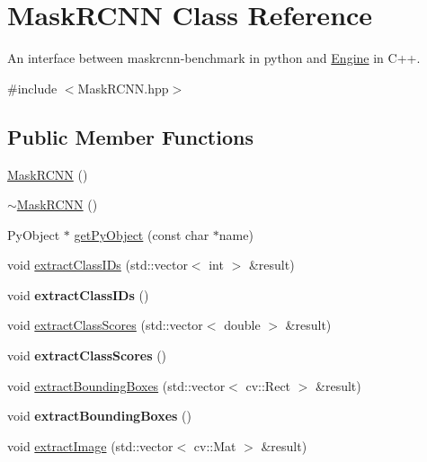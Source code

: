 \hypertarget{classMaskRCNN}{}\section{Mask\+R\+C\+NN Class Reference}
\label{classMaskRCNN}


An interface between maskrcnn-\/benchmark in python and \hyperlink{classEngine}{Engine} in C++.  




{\ttfamily \#include $<$Mask\+R\+C\+N\+N.\+hpp$>$}

\subsection*{Public Member Functions}
\begin{DoxyCompactItemize}
\item 
\hyperlink{classMaskRCNN_ad50b7f9668dbe3fbd9f63a509ffaa589}{Mask\+R\+C\+NN} ()
\item 
\hyperlink{classMaskRCNN_a56a6b1e8170b6cb5aceb0fcd1b529eeb}{$\sim$\+Mask\+R\+C\+NN} ()
\item 
Py\+Object $\ast$ \hyperlink{classMaskRCNN_ac053158f922a85807ba5bba9822848c7}{get\+Py\+Object} (const char $\ast$name)
\item 
void \hyperlink{classMaskRCNN_ad5c6a4317fbd032d5570ef672921d2b7}{extract\+Class\+I\+Ds} (std\+::vector$<$ int $>$ \&result)
\item 
\mbox{\label{classMaskRCNN_a7f8f5e498aaac37e57d46a029e7a3013}} 
void {\bfseries extract\+Class\+I\+Ds} ()
\item 
void \hyperlink{classMaskRCNN_af7c4acde0601ceb535d1ab7d79cf5825}{extract\+Class\+Scores} (std\+::vector$<$ double $>$ \&result)
\item 
\mbox{\label{classMaskRCNN_a91352e91d286e8829daed64eaef84aa8}} 
void {\bfseries extract\+Class\+Scores} ()
\item 
void \hyperlink{classMaskRCNN_a72c4683fed51fb8090971ce9baca40bb}{extract\+Bounding\+Boxes} (std\+::vector$<$ cv\+::\+Rect $>$ \&result)
\item 
\mbox{\label{classMaskRCNN_abd655a37eaa3d108e1c0018de9de697f}} 
void {\bfseries extract\+Bounding\+Boxes} ()
\item 
void \hyperlink{classMaskRCNN_a3645133094358fbe319b4ae6015d662a}{extract\+Image} (std\+::vector$<$ cv\+::\+Mat $>$ \&result)

\end{DoxyCompactItemize}
